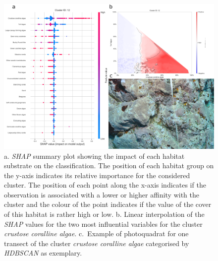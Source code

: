 \begin{figure}
\hypertarget{fig:chap2figS32}{%
\centering
\includegraphics{03-Chapitre2/figures/supplementary/05-explanation_shap_pq_cluster_12.png}
\caption{a. \emph{SHAP} summary plot showing the impact of each habitat
substrate on the classification. The position of each habitat group on
the y-axis indicates its relative importance for the considered cluster.
The position of each point along the x-axis indicates if the observation
is associated with a lower or higher affinity with the cluster and the
colour of the point indicates if the value of the cover of this habitat
is rather high or low. b. Linear interpolation of the \emph{SHAP} values
for the two most influential variables for the cluster \emph{crustose
coralline algae}. c.~Example of photoquadrat for one transect of the
cluster \emph{crustose coralline algae} categorised by \emph{HDBSCAN} as
exemplary.}\label{fig:chap2figS32}
}
\end{figure}


